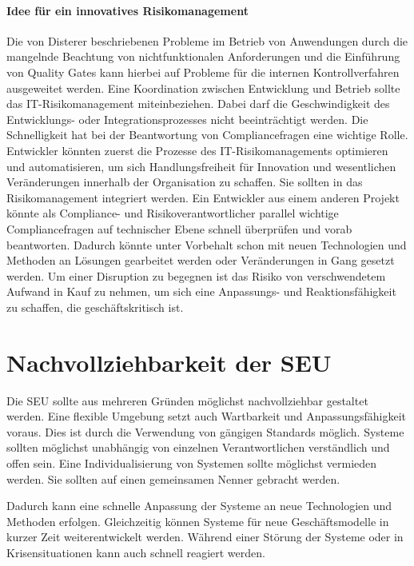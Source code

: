 \paragraph{Idee für ein innovatives Risikomanagement}
Die von Disterer beschriebenen Probleme im Betrieb von Anwendungen durch die mangelnde Beachtung von nichtfunktionalen Anforderungen und die Einführung von Quality Gates \cite{mci/Disterer2011} kann hierbei auf Probleme für die internen Kontrollverfahren ausgeweitet werden. Eine Koordination zwischen Entwicklung und Betrieb sollte das IT-Risikomanagement miteinbeziehen. Dabei darf die Geschwindigkeit des Entwicklungs- oder Integrationsprozesses nicht beeinträchtigt werden. Die Schnelligkeit hat bei der Beantwortung von Compliancefragen eine wichtige Rolle. Entwickler könnten zuerst die Prozesse des IT-Risikomanagements optimieren und automatisieren, um sich Handlungsfreiheit für Innovation und wesentlichen Veränderungen innerhalb der Organisation zu schaffen. Sie sollten in das Risikomanagement integriert werden. Ein Entwickler aus einem anderen Projekt könnte als Compliance- und Risikoverantwortlicher parallel wichtige Compliancefragen auf technischer Ebene schnell überprüfen und vorab beantworten. Dadurch könnte unter Vorbehalt schon mit neuen Technologien und Methoden an Lösungen gearbeitet werden oder Veränderungen in Gang gesetzt werden. Um einer Disruption zu begegnen ist das Risiko von verschwendetem Aufwand in Kauf zu nehmen, um sich eine Anpassungs- und Reaktionsfähigkeit zu schaffen, die geschäftskritisch ist.


\section{Nachvollziehbarkeit der SEU}
Die \ac{SEU} sollte aus mehreren Gründen möglichst nachvollziehbar gestaltet werden. Eine flexible Umgebung setzt auch Wartbarkeit und Anpassungsfähigkeit voraus. Dies ist durch die Verwendung von gängigen Standards möglich. Systeme sollten möglichst unabhängig von einzelnen Verantwortlichen verständlich und offen sein. Eine Individualisierung von Systemen sollte möglichst vermieden werden. Sie sollten auf einen gemeinsamen Nenner gebracht werden.

Dadurch kann eine schnelle Anpassung der Systeme an neue Technologien und Methoden erfolgen. Gleichzeitig können Systeme für neue Geschäftsmodelle in kurzer Zeit weiterentwickelt werden. Während einer Störung der Systeme oder in Krisensituationen kann auch schnell reagiert werden.

